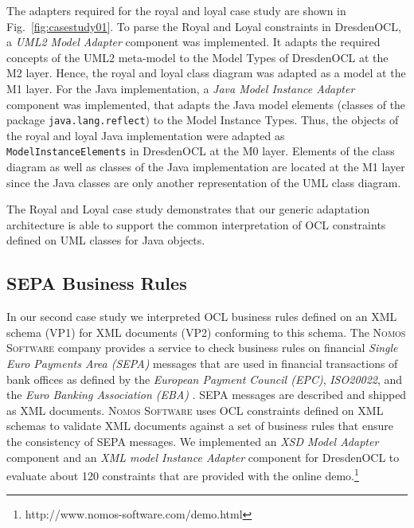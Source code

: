 The adapters required for the royal and loyal case study are shown in Fig.~\ref{fig:casestudy01}. To parse the Royal and Loyal constraints
in DresdenOCL, a \textit{UML2 Model Adapter} component was implemented. It
adapts the required concepts of the UML2 meta-model to the Model 
Types of DresdenOCL at the M2 layer. Hence, the royal and loyal class diagram was adapted as a model at the M1 layer.
For the Java implementation, a \textit{Java Model Instance Adapter} component was implemented,
that adapts the Java model elements (classes of the package \texttt{java.lang.reflect})
to the Model Instance Types. Thus, the objects of the royal and loyal Java implementation
were adapted as \texttt{ModelInstanceElements} in DresdenOCL at the M0 layer. Elements of
the class diagram as well as classes of the Java implementation are located at the M1 layer 
since the Java classes are only another representation of the UML class diagram.

The Royal and Loyal case study demonstrates that our generic adaptation architecture is able to 
support the common interpretation of OCL constraints defined on UML classes for Java objects.


\subsection{SEPA Business Rules}

In our second case study we interpreted OCL business rules
defined on an XML schema (VP1) for XML documents (VP2)
conforming to this schema. The \textsc{Nomos Software} company provides a
service to check business rules on financial \textit{Single Euro Payments Area (SEPA)} messages that are 
used in financial transactions of bank offices as defined by the \textit{European
Payment Council (EPC)}, \textit{ISO20022}, and the \textit{Euro Banking Association (EBA)} \cite{spec:UNIFI,spec:EPC,WWW:EBA}. 
SEPA messages are described and shipped as XML documents.
\textsc{Nomos Software} uses OCL constraints defined on XML schemas
to validate XML documents against a set of business rules that ensure the consistency of
SEPA messages. We implemented an \emph{XSD Model Adapter} component and an \emph{XML model
Instance Adapter} component for DresdenOCL to evaluate about 120 constraints that are provided 
with the online demo.\footnote{http://www.nomos-software.com/demo.html}

